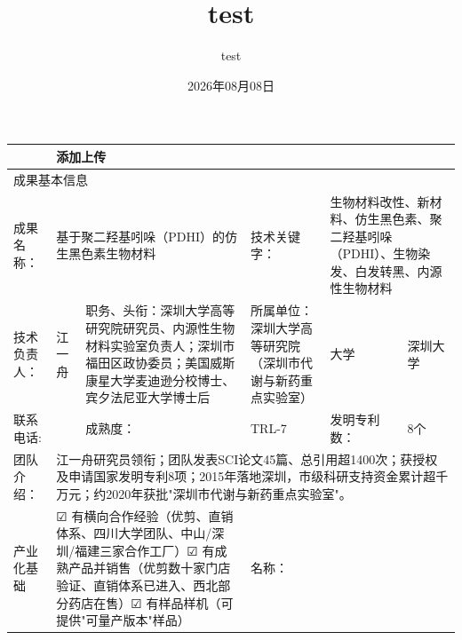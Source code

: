 \documentclass[nomath]{harryopo-paper}
\title{test}
\author{test}
\date{2026年08月08日}
\begin{document}
\maketitle

\newlength{\cellw}
\setlength{\cellw}{\dimexpr\dimexpr\textwidth-14\tabcolsep-7\arrayrulewidth-1pt\relax/6\relax}
\begin{longtable}{|p{\dimexpr\dimexpr\textwidth-14\tabcolsep-7\arrayrulewidth-1pt\relax/6\relax}|p{\dimexpr\dimexpr\textwidth-14\tabcolsep-7\arrayrulewidth-1pt\relax/6\relax}|p{\dimexpr\dimexpr\textwidth-14\tabcolsep-7\arrayrulewidth-1pt\relax/6\relax}|p{\dimexpr\dimexpr\textwidth-14\tabcolsep-7\arrayrulewidth-1pt\relax/6\relax}|p{\dimexpr\dimexpr\textwidth-14\tabcolsep-7\arrayrulewidth-1pt\relax/6\relax}|p{\dimexpr\dimexpr\textwidth-14\tabcolsep-7\arrayrulewidth-1pt\relax/6\relax}|}
\hline
\endfirsthead
\hline
\endhead
\hline
\endfoot
\hline
\endlastfoot
  \multicolumn{4}{|p{\dimexpr4\cellw+3\arrayrulewidth+6\tabcolsep\relax}|}{上传成果介绍材料【AI自动填写】} & \multicolumn{2}{|p{\dimexpr2\cellw+1\arrayrulewidth+2\tabcolsep\relax}|}{添加上传} \\ \hline
  \multicolumn{6}{|p{\dimexpr6\cellw+5\arrayrulewidth+10\tabcolsep\relax}|}{成果基本信息} \\ \hline
  成果名称： & \multicolumn{2}{|p{\dimexpr2\cellw+1\arrayrulewidth+2\tabcolsep\relax}|}{基于聚二羟基吲哚（PDHI）的仿生黑色素生物材料} & 技术关键 字： & \multicolumn{2}{|p{\dimexpr2\cellw+1\arrayrulewidth+2\tabcolsep\relax}|}{生物材料改性、新材料、仿生黑色素、聚二羟基吲哚（PDHI）、生物染发、白发转黑、内源性生物材料} \\ \hline
  技术负责人： & 江一舟 & 职务、头衔：深圳大学高等研究院研究员、内源性生物材料实验室负责人；深圳市福田区政协委员；美国威斯康星大学麦迪逊分校博士、宾夕法尼亚大学博士后 & 所属单位：深圳大学高等研究院（深圳市代谢与新药重点实验室） & 大学 & 深圳大学 \\ \hline
  联系电话: &  & 成熟度： & TRL-7 & 发明专利数： & 8个 \\ \hline
  团队介绍： & \multicolumn{5}{|p{\dimexpr5\cellw+4\arrayrulewidth+8\tabcolsep\relax}|}{江一舟研究员领衔；团队发表SCI论文45篇、总引用超1400次；获授权及申请国家发明专利8项；2015年落地深圳，市级科研支持资金累计超千万元；约2020年获批"深圳市代谢与新药重点实验室"。} \\ \hline
  产业化基础 & \multicolumn{2}{|p{\dimexpr2\cellw+1\arrayrulewidth+2\tabcolsep\relax}|}{☑ 有横向合作经验（优剪、直销体系、四川大学团队、中山/深圳/福建三家合作工厂）☑ 有成熟产品并销售（优剪数十家门店验证、直销体系已进入、西北部分药店在售）☑ 有样品样机（可提供"可量产版本"样品）} & 名称： & \multicolumn{2}{|p{\dimexpr2\cellw+1\arrayrulewidth+2\tabcolsep\relax}|}{} \\ \hline

\end{longtable}
\end{document}

